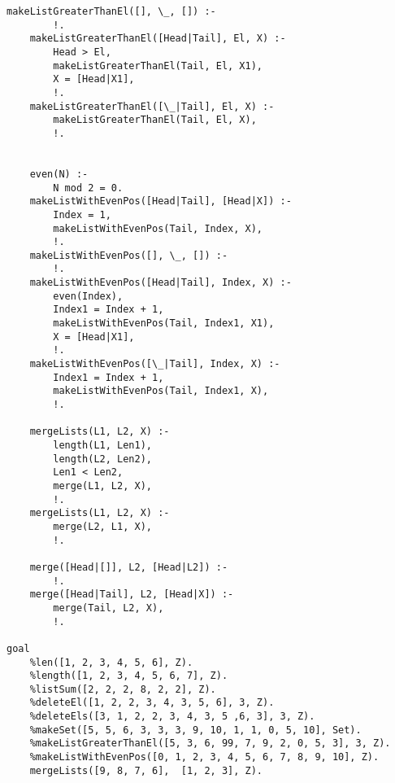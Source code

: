 \begin{lstlisting}[style=lispStyle, caption={Получение элементов списка с помощью команд car и cdr.},
                    label={lst:lists}]
    makeListGreaterThanEl([], \_, []) :-
        !.
    makeListGreaterThanEl([Head|Tail], El, X) :-
        Head > El,
        makeListGreaterThanEl(Tail, El, X1),
        X = [Head|X1],
        !.
    makeListGreaterThanEl([\_|Tail], El, X) :-
        makeListGreaterThanEl(Tail, El, X),
        !.


    even(N) :-
        N mod 2 = 0.
    makeListWithEvenPos([Head|Tail], [Head|X]) :-
        Index = 1,
        makeListWithEvenPos(Tail, Index, X),
        !.
    makeListWithEvenPos([], \_, []) :-
        !.
    makeListWithEvenPos([Head|Tail], Index, X) :-
        even(Index),
        Index1 = Index + 1,
        makeListWithEvenPos(Tail, Index1, X1),
        X = [Head|X1],
        !.
    makeListWithEvenPos([\_|Tail], Index, X) :-
        Index1 = Index + 1,
        makeListWithEvenPos(Tail, Index1, X),
        !.

    mergeLists(L1, L2, X) :-
        length(L1, Len1),
        length(L2, Len2),
        Len1 < Len2,
        merge(L1, L2, X),
        !.
    mergeLists(L1, L2, X) :-
        merge(L2, L1, X),
        !.

    merge([Head|[]], L2, [Head|L2]) :-
        !.
    merge([Head|Tail], L2, [Head|X]) :-
        merge(Tail, L2, X),
        !.

goal
    %len([1, 2, 3, 4, 5, 6], Z).
    %length([1, 2, 3, 4, 5, 6, 7], Z).
    %listSum([2, 2, 2, 8, 2, 2], Z).
    %deleteEl([1, 2, 2, 3, 4, 3, 5, 6], 3, Z).
    %deleteEls([3, 1, 2, 2, 3, 4, 3, 5 ,6, 3], 3, Z).
    %makeSet([5, 5, 6, 3, 3, 3, 9, 10, 1, 1, 0, 5, 10], Set).
    %makeListGreaterThanEl([5, 3, 6, 99, 7, 9, 2, 0, 5, 3], 3, Z).
    %makeListWithEvenPos([0, 1, 2, 3, 4, 5, 6, 7, 8, 9, 10], Z).
    mergeLists([9, 8, 7, 6],  [1, 2, 3], Z).

\end{lstlisting}

